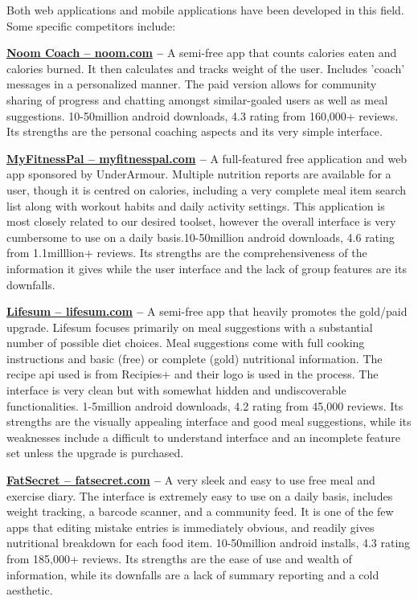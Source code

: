 \documentclass[a4paper,12pt]{article}
\begin{document}
Both web applications and mobile applications have been developed in this field.  Some specific competitors include: \begin{list}{•}{•}
\item \textbf{\href{http://www.noom.com}{Noom Coach -- noom.com} -- }A semi-free app that counts calories eaten and calories burned.  It then calculates and tracks weight of the user.  Includes 'coach' messages in a personalized manner.  The paid version allows for community sharing of progress and chatting amongst similar-goaled users as well as meal suggestions.  10-50million android downloads, 4.3 rating from 160,000+ reviews.  Its strengths are the personal coaching aspects and its very simple interface.
\item \textbf{\href{http://www.myfitnesspal.com}{MyFitnessPal -- myfitnesspal.com} -- }A full-featured free application and web app sponsored by UnderArmour.  Multiple nutrition reports are available for a user, though it is centred on calories, including a very complete meal item search list along with workout habits and daily activity settings.  This application is most closely related to our desired toolset, however the overall interface is very cumbersome to use on a daily basis.10-50million android downloads, 4.6 rating from 1.1milllion+ reviews.  Its strengths are the comprehensiveness of the information it gives while the user interface and the lack of group features are its downfalls.
\item \textbf{\href{http://www.lifesum.com}{Lifesum -- lifesum.com} -- }A semi-free app that heavily promotes the gold/paid upgrade.  Lifesum focuses primarily on meal suggestions with a substantial number of possible diet choices.  Meal suggestions come with full cooking instructions and basic (free) or complete (gold) nutritional information.  The recipe api used is from Recipies+ and their logo is used in the process.  The interface is very clean but with somewhat hidden and undiscoverable functionalities.  1-5million android downloads, 4.2 rating from 45,000 reviews.  Its strengths are the visually appealing interface and good meal suggestions, while its weaknesses include a difficult to understand interface and an incomplete feature set unless the upgrade is purchased.
\item \textbf{\href{http://www.fatsecret.com}{FatSecret -- fatsecret.com} -- }A very sleek and easy to use free meal and exercise diary.  The interface is extremely easy to use on a daily basis, includes weight tracking, a barcode scanner, and a community feed.  It is one of the few apps that editing mistake entries is immediately obvious, and readily gives nutritional breakdown for each food item.  10-50million android installs, 4.3 rating from 185,000+ reviews.  Its strengths are the ease of use and wealth of information, while its downfalls are a lack of summary reporting and a cold aesthetic.

\end{list}
\end{document}
